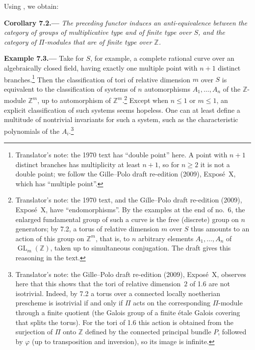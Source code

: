 Using , we obtain:

\par\medskip\noindent{}\textbf{Corollary 7.2.---}\enspace
\emph{The preceding functor induces an anti-equivalence between the
category of groups of multiplicative type and of finite type over \(S\),
and the category of \(\Pi\)-modules that are of finite type over
\(\mathbb{Z}\).}

\par\medskip\noindent{}\textbf{Example 7.3.---}\enspace
Take for \(S\), for example, a complete rational curve over an
algebraically closed field, having exactly one multiple point with
\(n+1\) distinct branches.\footnote{Translator's note: the 1970 text has
``double point'' here. A point with \(n+1\) distinct branches has
multiplicity at least \(n+1\), so for \(n\geq2\) it is not a double point;
we follow the Gille--Polo draft re-edition (2009), Exposé~X, which has ``multiple point''.} Then the
classification of tori of relative dimension \(m\) over \(S\) is
equivalent to the classification of systems of \(n\) automorphisms
\(A_1,\ldots,A_n\) of the \(\mathbb{Z}\)-module \(\mathbb{Z}^m\), up to
automorphism of \(\mathbb{Z}^m\).\footnote{Translator's note: the 1970
text, and the Gille--Polo draft re-edition (2009), Exposé~X, have ``endomorphisms''. By the examples at the
end of no.~6, the enlarged fundamental group of such a curve is the free
(discrete) group on \(n\) generators; by 7.2, a torus of relative
dimension \(m\) over \(S\) thus amounts to an action of this group on
\(\mathbb{Z}^m\), that is, to \(n\) arbitrary elements \(A_1,\ldots,A_n\)
of \(\operatorname{GL}_m(\mathbb{Z})\), taken up to simultaneous
conjugation. The draft gives this reasoning in the text.} Except when \(n\leq 1\) or \(m\leq 1\),
an explicit classification of such systems seems hopeless. One can at
least define a multitude of nontrivial invariants for such a system, such
as the characteristic polynomials of the \(A_i\).\footnote{Translator's
note: the Gille--Polo draft re-edition (2009), Exposé~X, observes here that this shows that the tori of
relative dimension~\(2\) of 1.6 are not isotrivial. Indeed, by 7.2 a torus
over a connected locally noetherian prescheme is isotrivial if and only if
\(\Pi\) acts on the corresponding \(\Pi\)-module through a finite quotient
(the Galois group of a finite étale Galois covering that splits the
torus). For the tori of 1.6 this action is obtained from the surjection of
\(\Pi\) onto \(\mathbb{Z}\) defined by the connected principal bundle
\(P\), followed by \(\varphi\) (up to transposition and inversion), so its
image is infinite.}

